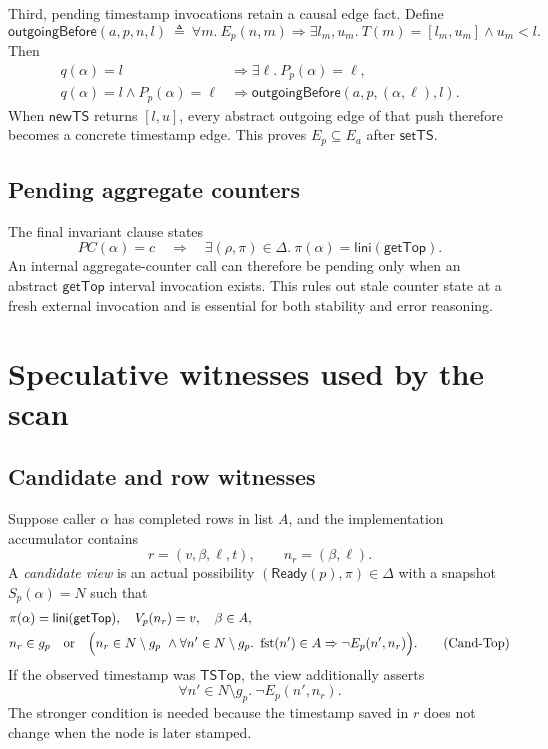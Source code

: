 \documentclass[11pt]{article}
\theoremstyle{definition}
\theoremstyle{remark}
\newcommand{\topts}{\mathsf{TSTop}}
\newcommand{\interval}[2]{[#1,#2]}
\newcommand{\fst}{\mathop{\mathrm{fst}}}
\newcommand{\Ready}{\mathsf{Ready}}
\newcommand{\Lini}{\mathsf{lini}}
\newcommand{\GetTop}{\mathsf{getTop}}
\newcommand{\arrayedge}{E_{\!a}}
\begin{document}
Third, pending timestamp invocations retain a causal edge fact.  Define
\[
\mathsf{outgoingBefore}(a,p,n,l)\ \triangleq\
  \forall m.\ E_p(n,m)\Longrightarrow
  \exists l_m,u_m.\ T(m)=\interval{l_m}{u_m}\land u_m<l.
\]
Then
\begin{align*}
q(\alpha)=l&\Longrightarrow\exists\ell.\ P_p(\alpha)=\ell,\\
q(\alpha)=l\land P_p(\alpha)=\ell
  &\Longrightarrow
  \mathsf{outgoingBefore}(a,p,(\alpha,\ell),l).
\tag{Rep-Causal}
\end{align*}
When \(\mathsf{newTS}\) returns \(\interval{l}{u}\), every abstract outgoing
edge of that push therefore becomes a concrete timestamp edge.  This proves
\(E_p\subseteq\arrayedge\) after \(\mathsf{setTS}\).

\subsection{Pending aggregate counters}

The final invariant clause states
\[
PC(\alpha)=c
\quad\Longrightarrow\quad
\exists(\rho,\pi)\in\Delta.\ \pi(\alpha)=\Lini(\GetTop).
\]
An internal aggregate-counter call can therefore be pending only when an
abstract \(\GetTop\) interval invocation exists.  This rules out stale
counter state at a fresh external invocation and is essential for both
stability and error reasoning.

\section{Speculative witnesses used by the scan}

\subsection{Candidate and row witnesses}

Suppose caller \(\alpha\) has completed rows in list \(A\), and the
implementation accumulator contains
\[
  r=(v,\beta,\ell,t),\qquad n_r=(\beta,\ell).
\]
A \emph{candidate view} is an actual possibility
\((\Ready(p),\pi)\in\Delta\) with a snapshot \(S_p(\alpha)=N\) such that
\begin{align*}
&\pi(\alpha)=\Lini(\GetTop),\quad V_p(n_r)=v,\quad \beta\in A,\\
&n_r\in g_p\quad\text{or}\quad
  \Bigl(n_r\in N\setminus g_p\ \land
   \forall n'\in N\setminus g_p.\
     \fst(n')\in A\Rightarrow\neg E_p(n',n_r)\Bigr).
\tag{Cand-Top}
\end{align*}
If the observed timestamp was \(\topts\), the view additionally asserts
\[
  \forall n'\in N\setminus g_p.\ \neg E_p(n',n_r).
\tag{Cand-TopTS}
\]
The stronger condition is needed because the timestamp saved in \(r\) does
not change when the node is later stamped.
\end{document}
